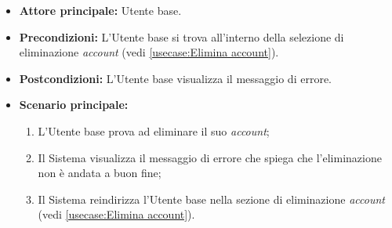 \label{usecase:Errore eliminazione account}
\begin{itemize}
	\item \textbf{Attore principale:} Utente base.

	\item \textbf{Precondizioni:}
	      L'Utente base si trova all'interno della selezione di eliminazione \textit{account} (vedi \autoref{usecase:Elimina account}).

	\item \textbf{Postcondizioni:}
	      L'Utente base visualizza il messaggio di errore.

	\item \textbf{Scenario principale:}
	      \begin{enumerate}
		      \item L'Utente base prova ad eliminare il suo \textit{account};
		      \item Il Sistema visualizza il messaggio di errore che spiega che l'eliminazione non è andata a buon fine;
		      \item Il Sistema reindirizza l'Utente base nella sezione di eliminazione \textit{account} (vedi \autoref{usecase:Elimina account}).
	      \end{enumerate}
\end{itemize}
